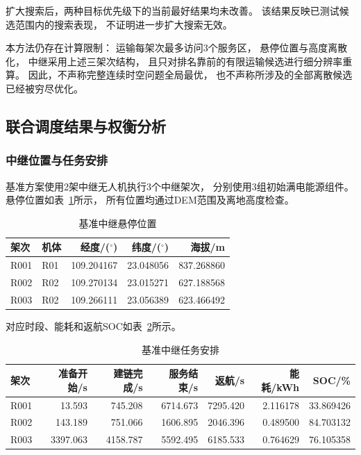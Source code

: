 \documentclass[bwprint]{gmcmthesis}
\begin{document}
扩大搜索后，两种目标优先级下的当前最好结果均未改善。
该结果反映已测试候选范围内的搜索表现，
不证明进一步扩大搜索无效。

本方法仍存在计算限制：
运输每架次最多访问3个服务区，
悬停位置与高度离散化，
中继采用上述三架次结构，
且只对排名靠前的有限运输候选进行细分辨率重算。
因此，不声称完整连续时空问题全局最优，
也不声称所涉及的全部离散候选已经被穷尽优化。

\subsection{联合调度结果与权衡分析}

\subsubsection{中继位置与任务安排}

基准方案使用2架中继无人机执行3个中继架次，
分别使用3组初始满电能源组件。
悬停位置如表~\ref{tab:q3_locations}所示，
所有位置均通过DEM范围及离地高度检查。

\begin{table}[htbp]
    \centering
    \caption{基准中继悬停位置}
    \label{tab:q3_locations}
    \begin{tabular}{llrrr}
        \toprule
        架次 & 机体 & 经度/($^\circ$) &
        纬度/($^\circ$) & 海拔/m \\
        \midrule
        R001 & R01 & 109.204167 & 23.048056 & 837.268860 \\
        R002 & R02 & 109.270134 & 23.015271 & 627.188568 \\
        R003 & R02 & 109.266111 & 23.056389 & 623.466492 \\
        \bottomrule
    \end{tabular}
\end{table}

对应时段、能耗和返航SOC如表~\ref{tab:q3_relay_schedule}所示。

\begin{table}[htbp]
    \centering
    \caption{基准中继任务安排}
    \label{tab:q3_relay_schedule}
    \small
    \begin{tabular}{lrrrrrr}
        \toprule
        架次 & 准备开始/s & 建链完成/s &
        服务结束/s & 返航/s & 能耗/kWh & SOC/\% \\
        \midrule
        R001 & 13.593 & 745.208 & 6714.673 &
        7295.420 & 2.116178 & 33.869426 \\
        R002 & 143.189 & 751.066 & 1606.895 &
        2046.396 & 0.489500 & 84.703132 \\
        R003 & 3397.063 & 4158.787 & 5592.495 &
        6185.533 & 0.764629 & 76.105358 \\
        \bottomrule
    \end{tabular}
\end{table}
\end{document}
